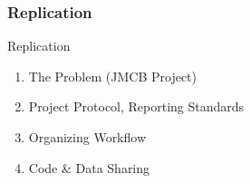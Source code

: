 \documentclass{beamer}
\begin{document}



\subsubsection*{Replication}
\begin{frame}{Replication}
\begin{enumerate}[<.->]
 \item The Problem	(JMCB Project)
 \item Project Protocol, Reporting Standards
 \item Organizing Workflow
 \item Code \& Data Sharing
\end{enumerate}
\end{frame}
\end{document}
